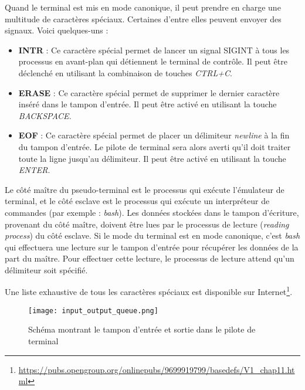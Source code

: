 Quand le terminal est mis en mode canonique, il peut prendre en charge une multitude de caractères spéciaux. Certaines d'entre elles peuvent envoyer des signaux. Voici quelques-uns :

\begin{itemize}
	\item \textbf{INTR} : Ce caractère spécial permet de lancer un signal SIGINT à tous les processus en avant-plan qui détiennent le terminal de contrôle. Il peut être déclenché en utilisant la combinaison de touches \textit{CTRL+C}.
	\item \textbf{ERASE} : Ce caractère spécial permet de supprimer le dernier caractère inséré dans le tampon d'entrée. Il peut être activé en utilisant la touche \textit{BACKSPACE}.
	\item \textbf{EOF} : Ce caractère spécial permet de placer un délimiteur \textit{newline} à la fin du tampon d'entrée. Le pilote de terminal sera alors averti qu'il doit traiter toute la ligne jusqu'au délimiteur. Il peut être activé en utilisant la touche \textit{ENTER}.
\end{itemize}

Le côté maître du pseudo-terminal est le processus qui exécute l'émulateur de terminal, et le côté esclave est le processus qui exécute un interpréteur de commandes (par exemple : \textit{bash}). Les données stockées dans le tampon d'écriture, provenant du côté maître, doivent être lues par le processus de lecture (\textit{reading process}) du côté esclave. Si le mode du terminal est en mode canonique, c'est \textit{bash} qui effectuera une lecture sur le tampon d'entrée pour récupérer les données de la part du maître. Pour effectuer cette lecture, le processus de lecture attend qu'un délimiteur soit spécifié.

Une liste exhaustive de tous les caractères spéciaux est disponible sur Internet\footnote{\url{https://pubs.opengroup.org/onlinepubs/9699919799/basedefs/V1_chap11.html}}.

\begin{figure}[h]
	\centering
	\texttt{[image: input\_output\_queue.png]}
	\caption{Schéma montrant le tampon d'entrée et sortie dans le pilote de terminal}
\end{figure}
